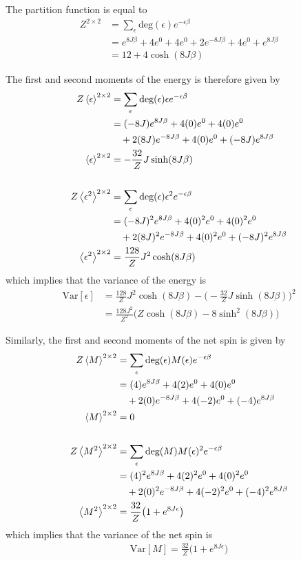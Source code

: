 \documentclass[nofootinbib,reprint,english]{revtex4-1}
\begin{document}
The partition function is equal to
\begin{align}
Z^{2\times2}&=\sum_\epsilon\text{deg}(\epsilon)e^{-\epsilon\beta}\nonumber\\
&=e^{8J\beta}+4e^0+4e^0+2e^{-8J\beta}+4e^0+e^{8J\beta}\nonumber\\
&=12+4\cosh(8J\beta)
\end{align}

The first and second moments of the energy is therefore given by
\begin{align}
Z\expval{\epsilon}^{2\times2}&=\sum_\epsilon\text{deg}(\epsilon)\epsilon e^{-\epsilon\beta}\nonumber\\
&=(-8J)e^{8J\beta}+4(0)e^0+4(0)e^0\nonumber\\
&\quad+2(8J)e^{-8J\beta}+4(0)e^0+(-8J)e^{8J\beta}\nonumber\\
\expval{\epsilon}^{2\times2}&=-\frac{32}{Z}J\sinh(8J\beta)\\[6mm]
Z\expval{\epsilon^2}^{2\times2}&=\sum_\epsilon\text{deg}(\epsilon)\epsilon^2e^{-\epsilon\beta}\nonumber\\
&=(-8J)^2e^{8J\beta}+4(0)^2e^0+4(0)^2e^0\nonumber\\
&\quad+2(8J)^2e^{-8J\beta}+4(0)^2e^0+(-8J)^2e^{8J\beta}\nonumber\\
\expval{\epsilon^2}^{2\times2}&=\frac{128}{Z}J^2\cosh(8J\beta)
\end{align}
which implies that the variance of the energy is
\begin{align}
\text{Var}[\epsilon]&=\frac{128}{Z}J^2\cosh(8J\beta)-\Big(-\frac{32}{Z}J\sinh(8J\beta)\Big)^2\nonumber\\
&=\frac{128J^2}{Z^2}\Big(Z\cosh(8J\beta)-8\sinh^2(8J\beta)\Big)\label{eq:2by2_epsilon_variance}
\end{align}

Similarly, the first and second moments of the net spin is given by
\begin{align}
Z\expval{M}^{2\times2}&=\sum_\epsilon\text{deg}(\epsilon)M(\epsilon) e^{-\epsilon\beta}\nonumber\\
&=(4)e^{8J\beta}+4(2)e^0+4(0)e^0\nonumber\\
&\quad+2(0)e^{-8J\beta}+4(-2)e^0+(-4)e^{8J\beta}\nonumber\\
\expval{M}^{2\times2}&=0\\[6mm]
Z\expval{M^2}^{2\times2}&=\sum_\epsilon\text{deg}(M)M(\epsilon)^2e^{-\epsilon\beta}\nonumber\\
&=(4)^2e^{8J\beta}+4(2)^2e^0+4(0)^2e^0\nonumber\\
&\quad+2(0)^2e^{-8J\beta}+4(-2)^2e^0+(-4)^2e^{8J\beta}\nonumber\\
\expval{M^2}^{2\times2}&=\frac{32}{Z}\big(1+e^{8J\epsilon}\big)
\end{align}
which implies that the variance of the net spin is
\begin{align}
\text{Var}[M]=\frac{32}{Z}\big(1+e^{8J\epsilon}\big)\label{eq:2by2_netspin_variance}
\end{align}
\end{document}
